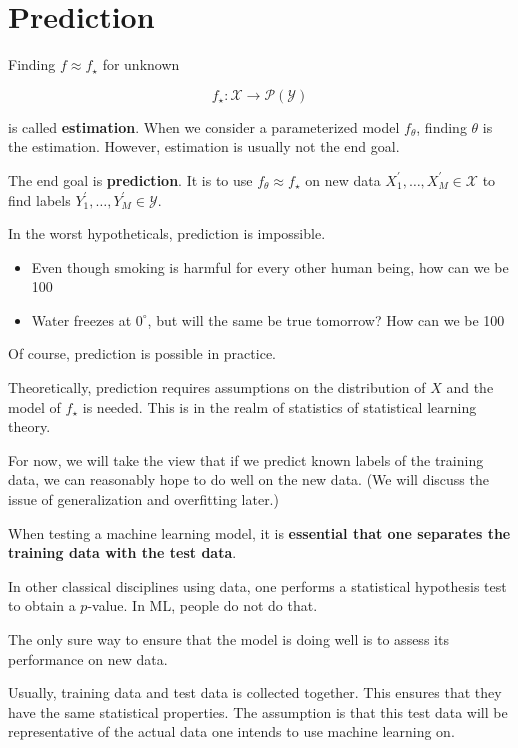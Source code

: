 \section{Prediction}

\begin{definition}
    Finding $f \approx f_{\star}$ for unknown

    $$
    f_{\star}: \mathcal{X} \rightarrow \mathcal{P}(\mathcal{Y})
    $$

    is called \textbf{estimation}. When we consider a parameterized model $f_{\theta}$, finding $\theta$ is the estimation. However, estimation is usually not the end goal.

    The end goal is \textbf{prediction}. It is to use $f_{\theta} \approx f_{\star}$ on new data $X_{1}^{\prime}, \ldots, X_{M}^{\prime} \in \mathcal{X}$ to find labels $Y_{1}^{\prime}, \ldots, Y_{M}^{\prime} \in \mathcal{Y}$.
\end{definition}

\begin{concept}
    In the worst hypotheticals, prediction is impossible.

    \begin{itemize}
        \item Even though smoking is harmful for every other human being, how can we be 100%
        \item Water freezes at $0^{\circ}$, but will the same be true tomorrow? How can we be 100%
    \end{itemize}

    Of course, prediction is possible in practice.

    Theoretically, prediction requires assumptions on the distribution of $X$ and the model of $f_{\star}$ is needed. This is in the realm of statistics of statistical learning theory.

    For now, we will take the view that if we predict known labels of the training data, we can reasonably hope to do well on the new data. (We will discuss the issue of generalization and overfitting later.)
\end{concept}

\begin{concept}
    When testing a machine learning model, it is \textbf{essential that one separates the training data with the test data}.

    In other classical disciplines using data, one performs a statistical hypothesis test to obtain a $p$-value. In ML, people do not do that.

    The only sure way to ensure that the model is doing well is to assess its performance on new data.

    Usually, training data and test data is collected together. This ensures that they have the same statistical properties. The assumption is that this test data will be representative of the actual data one intends to use machine learning on.
\end{concept}

